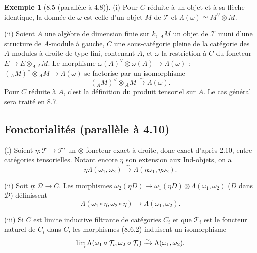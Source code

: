 \documentclass[12pt,a4paper]{article}
\theoremstyle{plain}
\theoremstyle{definition}
\newtheorem{example}[theorem]{Exemple}
\begin{document}
\begin{example}[8.5 (parallèle à 4.8)]
\textup{(i)} Pour $C$ réduite à un objet et à sa flèche identique, la donnée de $\omega$ est celle d'un objet $M$ de $\mathcal{T}$ et $\Lambda(\omega) \simeq M^\vee \otimes M$.

\textup{(ii)} Soient $A$ une algèbre de dimension finie sur $k$, $_A M$ un objet de $\mathcal{T}$ muni d'une structure de $A$-module à gauche, $C$ une sous-catégorie pleine de la catégorie des $A$-modules à droite de type fini, contenant $A$, et $\omega$ la restriction à $C$ du foncteur $E \mapsto E \otimes_A {_A M}$. Le morphisme $\omega(A)^\vee \otimes \omega(A) \to \Lambda(\omega)$ : $(_A M)^\vee \otimes {_A M} \to \Lambda(\omega)$ se factorise par un isomorphisme
\[
(_A M)^\vee \otimes {_A M} \xrightarrow{\sim} \Lambda(\omega).
\]
Pour $C$ réduite à $A$, c'est la définition du produit tensoriel sur $A$. Le cas général sera traité en 8.7.
\end{example}

\subsection{Fonctorialités (parallèle à 4.10)}

\textup{(i)} Soient $\eta : \mathcal{T} \to \mathcal{T}'$ un $\otimes$-foncteur exact à droite, donc exact d'après 2.10, entre catégories tensorielles. Notant encore $\eta$ son extension aux Ind-objets, on a
\begin{equation}\label{eq:8.6.1}
\eta \Lambda(\omega_1, \omega_2) \xrightarrow{\sim} \Lambda(\eta\omega_1, \eta\omega_2).
\end{equation}

\textup{(ii)} Soit $\eta : \mathcal{D} \to C$. Les morphismes $\omega_2(\eta D) \to \omega_1(\eta D) \otimes \Lambda(\omega_1, \omega_2)$ ($D$ dans $\mathcal{D}$) définissent
\begin{equation}\label{eq:8.6.2}
\Lambda(\omega_1 \circ \eta, \omega_2 \circ \eta) \to \Lambda(\omega_1, \omega_2).
\end{equation}

\textup{(iii)} Si $C$ est limite inductive filtrante de catégories $C_i$ et que $\mathcal{T}_i$ est le foncteur naturel de $C_i$ dans $C$, les morphismes (8.6.2) induisent un isomorphisme
\begin{equation}\label{eq:8.6.3}
\varinjlim \Lambda(\omega_1 \circ \mathcal{T}_i, \omega_2 \circ \mathcal{T}_i) \xrightarrow{\sim} \Lambda(\omega_1, \omega_2).
\end{equation}
\end{document}
